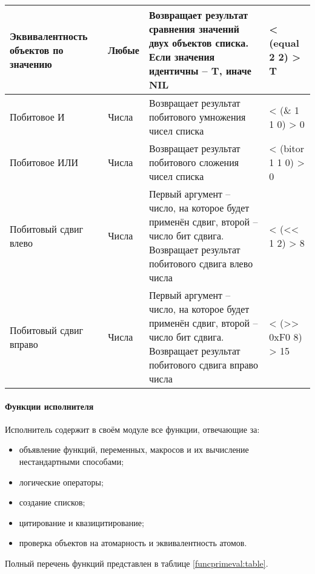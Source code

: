 \begin{xltabular}{\textwidth}{|p{3.6cm}|p{2cm}|p{6cm}|X|}
	Эквивалентность объектов по значению & Любые & Возвращает результат сравнения значений двух объектов списка. Если значения идентичны -- T, иначе NIL & < (equal 2 2) \linebreak > T \\ \hline 
	Побитовое И & Числа & Возвращает результат побитового умножения чисел списка & < (\& 1 1 0) \linebreak > 0 \\ \hline 
	Побитовое ИЛИ & Числа & Возвращает результат побитового сложения чисел списка & < (bitor 1 1 0) \linebreak > 0 \\ \hline 
	Побитовый сдвиг влево & Числа & Первый аргумент -- число, на которое будет применён сдвиг, второй -- число бит сдвига. Возвращает результат побитового сдвига влево числа & < (<< 1 2) \linebreak > 8 \\ \hline 
	Побитовый сдвиг вправо & Числа & Первый аргумент -- число, на которое будет применён сдвиг, второй -- число бит сдвига. Возвращает результат побитового сдвига вправо числа & < (>> 0xF0 8) \linebreak > 15
\end{xltabular}

\paragraph{Функции исполнителя}

Исполнитель содержит в своём модуле все функции, отвечающие за:
\begin{itemize}
	\item объявление функций, переменных, макросов и их вычисление нестандартными способами;
	\item логические операторы;
	\item создание списков;
	\item цитирование и квазицитирование;
	\item проверка объектов на атомарность и эквивалентность атомов.
\end{itemize}

Полный перечень функций представлен в таблице \ref{funcprimeval:table}.

